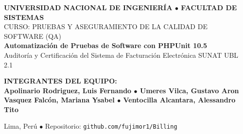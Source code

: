 \documentclass[aspectratio=169,10pt]{beamer}
\begin{document}
\begin{frame}[plain]
\vspace{0.6cm}
\begin{center}
    {\fontsize{7.5pt}{8.5pt}\selectfont\bfseries\color{accentblue}UNIVERSIDAD NACIONAL DE INGENIERÍA \quad $\bullet$ \quad FACULTAD DE SISTEMAS}\\[0.1cm]
    {\fontsize{6.8pt}{7.8pt}\selectfont\color{textgray}CURSO: PRUEBAS Y ASEGURAMIENTO DE LA CALIDAD DE SOFTWARE (QA)}\\[0.4cm]

    {\fontsize{14pt}{16pt}\selectfont\bfseries\color{textwhite}Automatización de Pruebas de Software con PHPUnit 10.5}\\[0.15cm]
    {\fontsize{9pt}{10.5pt}\selectfont\color{accentblue}Auditoría y Certificación del Sistema de Facturación Electrónica SUNAT UBL 2.1}\\[0.45cm]

    \begin{tcolorbox}[colback=cardbg, colframe=cardbg, width=0.88\textwidth, arc=2.5mm, boxrule=0mm, top=3mm, bottom=3mm]
        \begin{center}
        \fontsize{7.5pt}{9.5pt}\selectfont\bfseries\color{accentamber}INTEGRANTES DEL EQUIPO:\\[0.12cm]
        \color{textwhite}
        Apolinario Rodriguez, Luis Fernando \quad $\bullet$ \quad Umeres Vilca, Gustavo Aron\\[0.06cm]
        Vasquez Falcón, Mariana Ysabel \quad $\bullet$ \quad Ventocilla Alcantara, Alessandro Tito
        \end{center}
    \end{tcolorbox}
    \vspace{0.25cm}
    {\fontsize{6.2pt}{7.2pt}\selectfont\color{textgray}Lima, Perú \quad $\bullet$ \quad Repositorio: \texttt{github.com/fujimor1/Billing}}
\end{center}
\end{frame}
\end{document}
